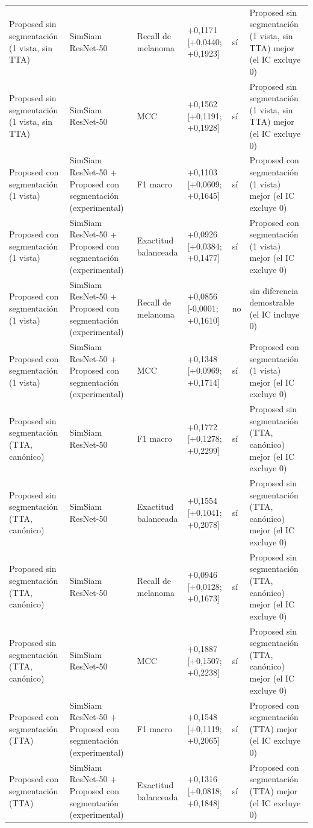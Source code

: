 \begin{longtable}{@{}llllll@{}}
Proposed sin segmentación (1 vista, sin TTA) & SimSiam ResNet-50 & Recall de melanoma & +0,1171 [+0,0440; +0,1923] & sí & Proposed sin segmentación (1 vista, sin TTA) mejor (el IC excluye 0) \\
Proposed sin segmentación (1 vista, sin TTA) & SimSiam ResNet-50 & MCC & +0,1562 [+0,1191; +0,1928] & sí & Proposed sin segmentación (1 vista, sin TTA) mejor (el IC excluye 0) \\
Proposed con segmentación (1 vista) & SimSiam ResNet-50 + Proposed con segmentación (experimental) & F1 macro & +0,1103 [+0,0609; +0,1645] & sí & Proposed con segmentación (1 vista) mejor (el IC excluye 0) \\
Proposed con segmentación (1 vista) & SimSiam ResNet-50 + Proposed con segmentación (experimental) & Exactitud balanceada & +0,0926 [+0,0384; +0,1477] & sí & Proposed con segmentación (1 vista) mejor (el IC excluye 0) \\
Proposed con segmentación (1 vista) & SimSiam ResNet-50 + Proposed con segmentación (experimental) & Recall de melanoma & +0,0856 [-0,0001; +0,1610] & no & sin diferencia demostrable (el IC incluye 0) \\
Proposed con segmentación (1 vista) & SimSiam ResNet-50 + Proposed con segmentación (experimental) & MCC & +0,1348 [+0,0969; +0,1714] & sí & Proposed con segmentación (1 vista) mejor (el IC excluye 0) \\
Proposed sin segmentación (TTA, canónico) & SimSiam ResNet-50 & F1 macro & +0,1772 [+0,1278; +0,2299] & sí & Proposed sin segmentación (TTA, canónico) mejor (el IC excluye 0) \\
Proposed sin segmentación (TTA, canónico) & SimSiam ResNet-50 & Exactitud balanceada & +0,1554 [+0,1041; +0,2078] & sí & Proposed sin segmentación (TTA, canónico) mejor (el IC excluye 0) \\
Proposed sin segmentación (TTA, canónico) & SimSiam ResNet-50 & Recall de melanoma & +0,0946 [+0,0128; +0,1673] & sí & Proposed sin segmentación (TTA, canónico) mejor (el IC excluye 0) \\
Proposed sin segmentación (TTA, canónico) & SimSiam ResNet-50 & MCC & +0,1887 [+0,1507; +0,2238] & sí & Proposed sin segmentación (TTA, canónico) mejor (el IC excluye 0) \\
Proposed con segmentación (TTA) & SimSiam ResNet-50 + Proposed con segmentación (experimental) & F1 macro & +0,1548 [+0,1119; +0,2065] & sí & Proposed con segmentación (TTA) mejor (el IC excluye 0) \\
Proposed con segmentación (TTA) & SimSiam ResNet-50 + Proposed con segmentación (experimental) & Exactitud balanceada & +0,1316 [+0,0818; +0,1848] & sí & Proposed con segmentación (TTA) mejor (el IC excluye 0) \\

\end{longtable}
